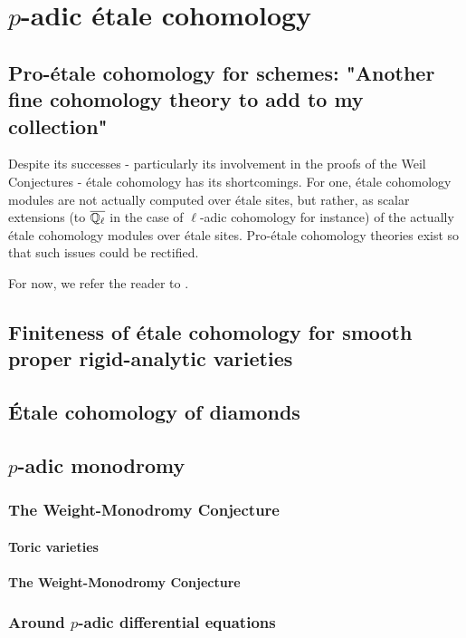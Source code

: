 \chapter{\texorpdfstring{$p$}{}-adic \'etale cohomology}
    \begin{abstract}
        
    \end{abstract}
    
    \minitoc
    
    \section{Pro-\'etale cohomology for schemes: "Another fine cohomology theory to add to my collection"}
        Despite its successes - particularly its involvement in the proofs of the Weil Conjectures - \'etale cohomology has its shortcomings. For one, \'etale cohomology modules are not actually computed over \'etale sites, but rather, as scalar extensions (to $\overline{\mathbb{Q}_{\ell}}$ in the case of $\ell$-adic cohomology for instance) of the actually \'etale cohomology modules over \'etale sites. Pro-\'etale cohomology theories exist so that such issues could be rectified. 
        
        \begin{remark}
            For now, we refer the reader to \cite[Definition 4.1.1 and Remark 4.1.3]{bhatt_scholze_2014_pro_etale}.
        \end{remark}
        
    \section{Finiteness of \'etale cohomology for smooth proper rigid-analytic varieties}
    
    \section{\'Etale cohomology of diamonds}
        
    \section{\texorpdfstring{$p$}{}-adic monodromy}
        \subsection{The Weight-Monodromy Conjecture}
            \subsubsection{Toric varieties}
            
            \subsubsection{The Weight-Monodromy Conjecture}
            
        \subsection{Around \texorpdfstring{$p$}{}-adic differential equations}